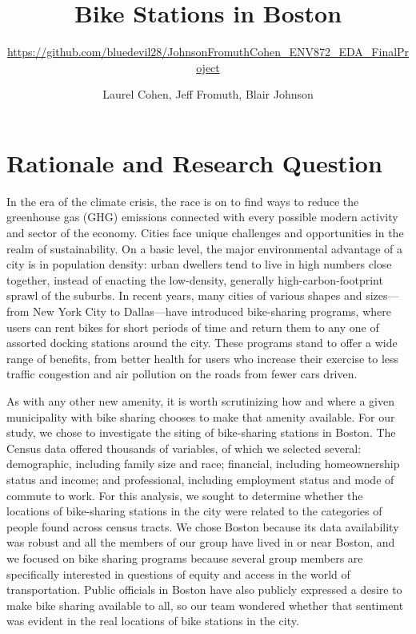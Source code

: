 \documentclass[
  12pt,
]{article}
\title{Bike Stations in Boston}
\subtitle{\url{https://github.com/bluedevil28/JohnsonFromuthCohen_ENV872_EDA_FinalProject}}
\author{Laurel Cohen, Jeff Fromuth, Blair Johnson}
\date{}
\begin{document}
\maketitle

\newpage

\hypertarget{rationale-and-research-question}{%
\section{Rationale and Research
Question}\label{rationale-and-research-question}}

In the era of the climate crisis, the race is on to find ways to reduce
the greenhouse gas (GHG) emissions connected with every possible modern
activity and sector of the economy. Cities face unique challenges and
opportunities in the realm of sustainability. On a basic level, the
major environmental advantage of a city is in population density: urban
dwellers tend to live in high numbers close together, instead of
enacting the low-density, generally high-carbon-footprint sprawl of the
suburbs. In recent years, many cities of various shapes and sizes---from
New York City to Dallas---have introduced bike-sharing programs, where
users can rent bikes for short periods of time and return them to any
one of assorted docking stations around the city. These programs stand
to offer a wide range of benefits, from better health for users who
increase their exercise to less traffic congestion and air pollution on
the roads from fewer cars driven.

As with any other new amenity, it is worth scrutinizing how and where a
given municipality with bike sharing chooses to make that amenity
available. For our study, we chose to investigate the siting of
bike-sharing stations in Boston. The Census data offered thousands of
variables, of which we selected several: demographic, including family
size and race; financial, including homeownership status and income; and
professional, including employment status and mode of commute to work.
For this analysis, we sought to determine whether the locations of
bike-sharing stations in the city were related to the categories of
people found across census tracts. We chose Boston because its data
availability was robust and all the members of our group have lived in
or near Boston, and we focused on bike sharing programs because several
group members are specifically interested in questions of equity and
access in the world of transportation. Public officials in Boston have
also publicly expressed a desire to make bike sharing available to all,
so our team wondered whether that sentiment was evident in the real
locations of bike stations in the city.
\end{document}
